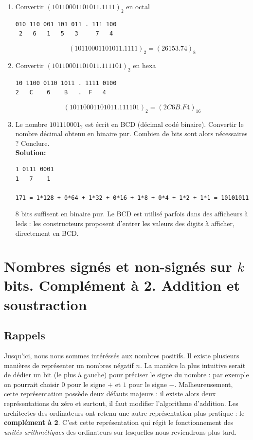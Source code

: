 \documentclass[a4paper,11pt]{article}
\begin{document}
\begin{enumerate}
\item { Convertir $(10110001101011.1111 )_2$ en octal}
\begin{verbatim}
010 110 001 101 011 . 111 100
 2   6   1   5   3     7   4
\end{verbatim}
$$( 10110001101011.1111 )_2 = ( 26153.74 )_8$$


\item { Convertir  $(10110001101011.111101 )_2$ en hexa}\\
\begin{verbatim}
10 1100 0110 1011 . 1111 0100
2   C    6    B   .  F   4
\end{verbatim}
$$( 10110001101011.111101 )_2 = ( 2C6B.F4 )_{16}$$

\item {Le nombre $101110001_2$ est écrit en BCD (décimal codé binaire). Convertir le nombre décimal obtenu en binaire pur. Combien de bits sont alors nécessaires ? Conclure.}\\
{\bf Solution:}
\begin{verbatim}
1 0111 0001
1   7    1

171 = 1*128 + 0*64 + 1*32 + 0*16 + 1*8 + 0*4 + 1*2 + 1*1 = 10101011
\end{verbatim}
8 bits suffisent en binaire pur. Le BCD est utilisé parfois dans des afficheurs à leds : les constructeurs proposent d'entrer les valeurs des digits à afficher, directement en BCD.

\end{enumerate}

\section{Nombres signés et non-signés sur $k$ bits. Complément à 2. Addition et soustraction}

\subsection*{Rappels} Jusqu'ici, nous nous sommes intéréssés aux nombres positifs. Il existe plusieurs manières de représenter un nombres négatif $n$. La manière la plus intuitive serait de dédier un bit (le plus à gauche) pour préciser le signe du nombre : par exemple on pourrait choisir $0$ pour le signe $+$ et $1$ pour le signe $-$. Malheureusement, cette représentation possède deux défauts majeurs : il existe alors deux représentations du zéro et surtout, il faut modifier l'algorithme d'addition. Les architectes des ordinateurs ont retenu une autre représentation plus pratique : le {\bf complément à 2}. C'est cette représentation qui régit le fonctionnement des {\it unités arithmétiques} des ordinateurs sur lesquelles nous reviendrons plus tard.\\
\end{document}
